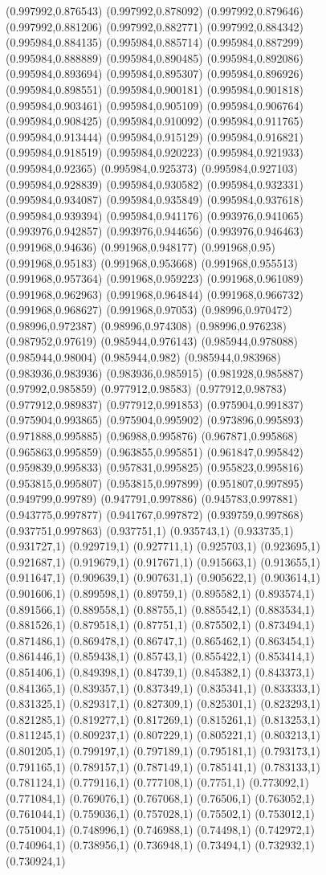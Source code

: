 \documentclass[conference]{IEEEtran}
\begin{document}
\begin{figure}[t]
(0.997992,0.876543) (0.997992,0.878092) (0.997992,0.879646) (0.997992,0.881206) (0.997992,0.882771) (0.997992,0.884342) (0.995984,0.884135) (0.995984,0.885714) (0.995984,0.887299) (0.995984,0.888889) (0.995984,0.890485) (0.995984,0.892086) (0.995984,0.893694) (0.995984,0.895307) (0.995984,0.896926) (0.995984,0.898551) (0.995984,0.900181) (0.995984,0.901818) (0.995984,0.903461) (0.995984,0.905109) (0.995984,0.906764) (0.995984,0.908425) (0.995984,0.910092) (0.995984,0.911765) (0.995984,0.913444) (0.995984,0.915129) (0.995984,0.916821) (0.995984,0.918519) (0.995984,0.920223) (0.995984,0.921933) (0.995984,0.92365) (0.995984,0.925373) (0.995984,0.927103) (0.995984,0.928839) (0.995984,0.930582) (0.995984,0.932331) (0.995984,0.934087) (0.995984,0.935849) (0.995984,0.937618) (0.995984,0.939394) (0.995984,0.941176) (0.993976,0.941065) (0.993976,0.942857) (0.993976,0.944656) (0.993976,0.946463) (0.991968,0.94636) (0.991968,0.948177) (0.991968,0.95) (0.991968,0.95183) (0.991968,0.953668) (0.991968,0.955513) (0.991968,0.957364) (0.991968,0.959223) (0.991968,0.961089) (0.991968,0.962963) (0.991968,0.964844) (0.991968,0.966732) (0.991968,0.968627) (0.991968,0.97053) (0.98996,0.970472) (0.98996,0.972387) (0.98996,0.974308) (0.98996,0.976238) (0.987952,0.97619) (0.985944,0.976143) (0.985944,0.978088) (0.985944,0.98004) (0.985944,0.982) (0.985944,0.983968) (0.983936,0.983936) (0.983936,0.985915) (0.981928,0.985887) (0.97992,0.985859) (0.977912,0.98583) (0.977912,0.98783) (0.977912,0.989837) (0.977912,0.991853) (0.975904,0.991837) (0.975904,0.993865) (0.975904,0.995902) (0.973896,0.995893) (0.971888,0.995885) (0.96988,0.995876) (0.967871,0.995868) (0.965863,0.995859) (0.963855,0.995851) (0.961847,0.995842) (0.959839,0.995833) (0.957831,0.995825) (0.955823,0.995816) (0.953815,0.995807) (0.953815,0.997899) (0.951807,0.997895) (0.949799,0.99789) (0.947791,0.997886) (0.945783,0.997881) (0.943775,0.997877) (0.941767,0.997872) (0.939759,0.997868) (0.937751,0.997863) (0.937751,1) (0.935743,1) (0.933735,1) (0.931727,1) (0.929719,1) (0.927711,1) (0.925703,1) (0.923695,1) (0.921687,1) (0.919679,1) (0.917671,1) (0.915663,1) (0.913655,1) (0.911647,1) (0.909639,1) (0.907631,1) (0.905622,1) (0.903614,1) (0.901606,1) (0.899598,1) (0.89759,1) (0.895582,1) (0.893574,1) (0.891566,1) (0.889558,1) (0.88755,1) (0.885542,1) (0.883534,1) (0.881526,1) (0.879518,1) (0.87751,1) (0.875502,1) (0.873494,1) (0.871486,1) (0.869478,1) (0.86747,1) (0.865462,1) (0.863454,1) (0.861446,1) (0.859438,1) (0.85743,1) (0.855422,1) (0.853414,1) (0.851406,1) (0.849398,1) (0.84739,1) (0.845382,1) (0.843373,1) (0.841365,1) (0.839357,1) (0.837349,1) (0.835341,1) (0.833333,1) (0.831325,1) (0.829317,1) (0.827309,1) (0.825301,1) (0.823293,1) (0.821285,1) (0.819277,1) (0.817269,1) (0.815261,1) (0.813253,1) (0.811245,1) (0.809237,1) (0.807229,1) (0.805221,1) (0.803213,1) (0.801205,1) (0.799197,1) (0.797189,1) (0.795181,1) (0.793173,1) (0.791165,1) (0.789157,1) (0.787149,1) (0.785141,1) (0.783133,1) (0.781124,1) (0.779116,1) (0.777108,1) (0.7751,1) (0.773092,1) (0.771084,1) (0.769076,1) (0.767068,1) (0.76506,1) (0.763052,1) (0.761044,1) (0.759036,1) (0.757028,1) (0.75502,1) (0.753012,1) (0.751004,1) (0.748996,1) (0.746988,1) (0.74498,1) (0.742972,1) (0.740964,1) (0.738956,1) (0.736948,1) (0.73494,1) (0.732932,1) (0.730924,1) 
\end{figure}
\end{document}
